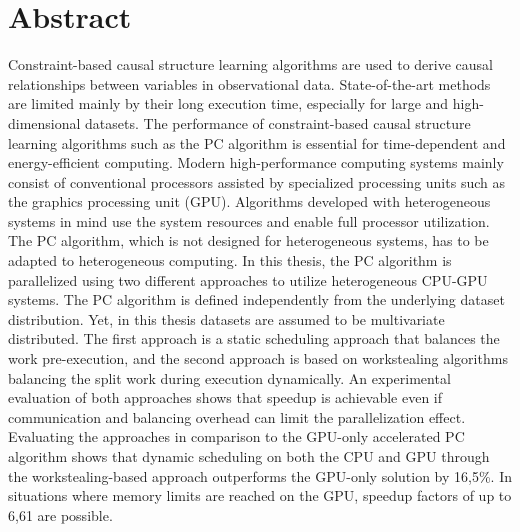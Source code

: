 \chapter*{Abstract}
Constraint-based causal structure learning algorithms are used to derive causal relationships between variables in observational data. State-of-the-art methods are limited mainly by their long execution time, especially for large and high-dimensional datasets. The performance of constraint-based causal structure learning algorithms such as the PC algorithm is essential for time-dependent and energy-efficient computing. Modern high-performance computing systems mainly consist of conventional processors assisted by specialized processing units such as the graphics processing unit (GPU). Algorithms developed with heterogeneous systems in mind use the system resources and enable full processor utilization. The PC algorithm, which is not designed for heterogeneous systems, has to be adapted to heterogeneous computing. In this thesis, the PC algorithm is parallelized using two different approaches to utilize heterogeneous CPU-GPU systems. The PC algorithm is defined independently from the underlying dataset distribution. Yet, in this thesis datasets are assumed to be multivariate distributed. The first approach is a static scheduling approach that balances the work pre-execution, and the second approach is based on workstealing algorithms balancing the split work during execution dynamically. An experimental evaluation of both approaches shows that speedup is achievable even if communication and balancing overhead can limit the parallelization effect. Evaluating the approaches in comparison to the GPU-only accelerated PC algorithm shows that dynamic scheduling on both the CPU and GPU through the workstealing-based approach outperforms the GPU-only solution by 16,5\%. In situations where memory limits are reached on the GPU, speedup factors of up to 6,61 are possible.

